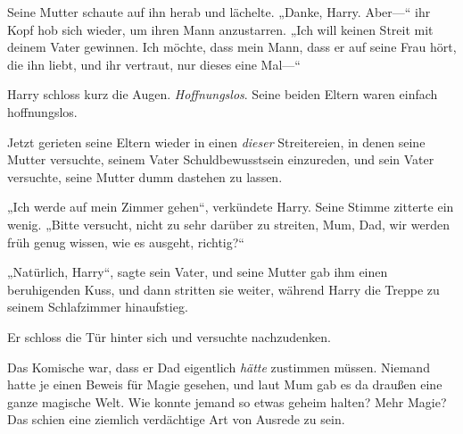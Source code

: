 Seine Mutter schaute auf ihn herab und lächelte. „Danke, Harry. Aber—“ ihr Kopf hob sich wieder, um ihren Mann anzustarren. „Ich will keinen Streit mit deinem Vater gewinnen. Ich möchte, dass mein Mann, dass er auf seine Frau hört, die ihn liebt, und ihr vertraut, nur dieses eine Mal—“

Harry schloss kurz die Augen. \emph{Hoffnungslos}. Seine beiden Eltern waren einfach hoffnungslos.

Jetzt gerieten seine Eltern wieder in einen \emph{dieser} Streitereien, in denen seine Mutter versuchte, seinem Vater Schuldbewusstsein einzureden, und sein Vater versuchte, seine Mutter dumm dastehen zu lassen.

„Ich werde auf mein Zimmer gehen“, verkündete Harry. Seine Stimme zitterte ein wenig. „Bitte versucht, nicht zu sehr darüber zu streiten, Mum, Dad, wir werden früh genug wissen, wie es ausgeht, richtig?“

„Natürlich, Harry“, sagte sein Vater, und seine Mutter gab ihm einen beruhigenden Kuss, und dann stritten sie weiter, während Harry die Treppe zu seinem Schlafzimmer hinaufstieg.

Er schloss die Tür hinter sich und versuchte nachzudenken.

Das Komische war, dass er Dad eigentlich \emph{hätte} zustimmen müssen. Niemand hatte je einen Beweis für Magie gesehen, und laut Mum gab es da draußen eine ganze magische Welt. Wie konnte jemand so etwas geheim halten? Mehr Magie? Das schien eine ziemlich verdächtige Art von Ausrede zu sein.

